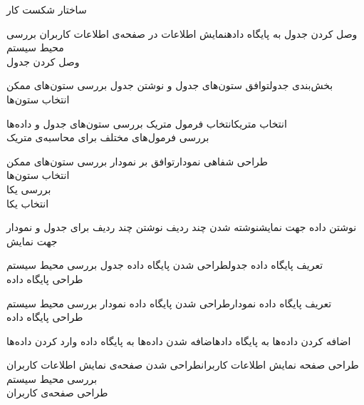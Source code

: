 \begin{wbsbox}{ساختار شکست کار}
\begin{wbssub}{وصل کردن جدول به پایگاه داده}{نمایش اطلاعات در صفحه‌ی اطلاعات کاربران}
\task بررسی محیط سیستم  \\
\task وصل کردن جدول
\end{wbssub}

\begin{wbssub}{بخش‌بندی جدول}{توافق ستون‌های جدول و نوشتن جدول}
\task بررسی ستون‌های ممکن \\
\task انتخاب ستون‌ها
\end{wbssub}

\begin{wbssub}{انتخاب متریک}{انتخاب فرمول متریک}
\task بررسی ستون‌های جدول و داده‌ها\\
\task بررسی فرمول‌های مختلف ‌برای محاسبه‌ی متریک
\end{wbssub}

\begin{wbssub}{طراحی شفاهی نمودار}{توافق بر نمودار}
\task بررسی ستون‌های ممکن \\
\task انتخاب ستون‌ها \\
\task بررسی یکا \\
\task انتخاب یکا
\end{wbssub}

\begin{wbssub}{نوشتن داده جهت نمایش}{نوشته شدن چند ردیف}
\task نوشتن چند ردیف برای جدول و نمودار جهت نمایش
\end{wbssub}

\begin{wbssub}{تعریف پایگاه داده جدول}{طراحی شدن پایگاه داده جدول}
\task بررسی محیط سیستم  \\
\task طراحی پایگاه داده
\end{wbssub}

\begin{wbssub}{تعریف پایگاه داده نمودار}{طراحی شدن پایگاه داده نمودار}
\task بررسی محیط سیستم  \\
\task طراحی پایگاه داده
\end{wbssub}

\begin{wbssub}{اضافه کردن داده‌ها به پایگاه داده}{اضافه شدن داده‌ها به پایگاه داده}
\task وارد کردن داده‌ها
\end{wbssub}

\begin{wbssub}{طراحی صفحه نمایش اطلاعات کاربران}{طراحی شدن صفحه‌ی نمایش اطلاعات کاربران}
\task بررسی محیط سیستم  \\
\task طراحی صفحه‌ی کاربران
\end{wbssub}


\end{wbsbox}
